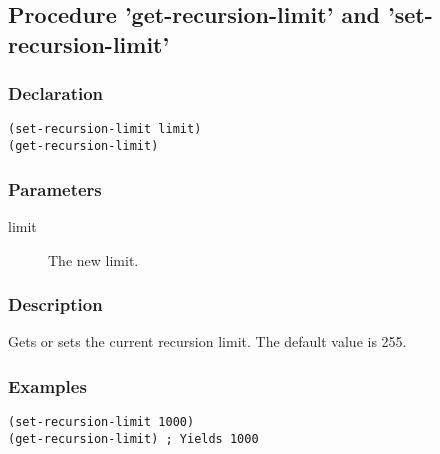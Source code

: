 \subsection{Procedure 'get-recursion-limit' and 'set-recursion-limit'}
\label{builtins/recursion-limit}

\subsubsection*{Declaration}
\begin{lstlisting}
(set-recursion-limit limit)
(get-recursion-limit)
\end{lstlisting}

\subsubsection*{Parameters}
\begin{description}
	\item[limit] The new limit.
\end{description}

\subsubsection*{Description}
Gets or sets the current recursion limit. The default value is 255.

\subsubsection*{Examples}
\begin{lstlisting}
(set-recursion-limit 1000)
(get-recursion-limit) ; Yields 1000
\end{lstlisting}
